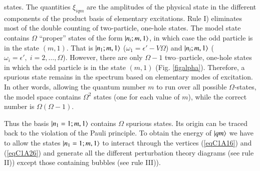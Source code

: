 states. The quantities $\xi_{iqm}$ are the amplitudes of the physical state in the different components of the product basis of elementary excitations. Rule I) eliminates most of the double counting of two-particle, one-hole states. The model state contains $\Omega$ ``proper'' states of the form $|{n_i;m,1} \rangle$,  in which case the odd particle is in the state $(m,1)$. That is $|{n_1;m,1} \rangle$ ($\omega_1=\epsilon'-V\Omega$) and $|{n_i;m,1} \rangle$ ($\omega_i=\epsilon',\; i=2,\dots,\Omega$). However, there are only $\Omega-1$ two--particle, one-hole states in which the odd particle is in the state $(m,1)$ (Fig. \ref{figalpha}). Therefore, a spurious state remains in the spectrum based on elementary modes of excitation. In other words, allowing the quantum number $m$ to run over all possible $\Omega$-states, the  model space contains $\Omega^2$ states (one for each value of $m$), while the correct number is $\Omega(\Omega-1)$.


 
Thus the basis $|{n_1=1; m,1} \rangle$ contains $\Omega$ spurious states. Its origin can be
traced back to the violation of the Pauli principle.
To obtain the energy of $|{qm} \rangle$ we have to allow the states $|{n_1=1;m,1} \rangle$
to interact through the vertices (\ref{eqC1A16}) and (\ref{eqC1A26}) and generate all the different
perturbation theory diagrams (see rule II)) except those containing bubbles
(see rule III)).


